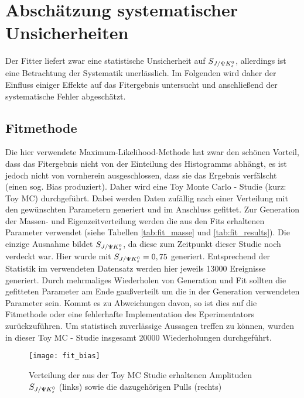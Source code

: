 \chapter{Abschätzung systematischer Unsicherheiten} \label{kap:systematik}
Der Fitter liefert zwar eine statistische Unsicherheit auf $S_{J/\Psi K_s^0}$, allerdings ist eine Betrachtung der Systematik unerlässlich. Im Folgenden wird daher der Einfluss einiger Effekte auf das Fitergebnis untersucht und anschließend der systematische Fehler abgeschätzt.

\section{Fitmethode} \label{kap:fit_bias}
Die hier verwendete Maximum-Likelihood-Methode hat zwar den schönen Vorteil, dass das Fitergebnis nicht von der Einteilung des Histogramms abhängt, es ist jedoch nicht von vornherein ausgeschlossen, dass sie das Ergebnis verfälscht (einen sog. Bias produziert). Daher wird eine Toy Monte Carlo - Studie (kurz: Toy MC) durchgeführt. Dabei werden Daten zufällig nach einer Verteilung mit den gewünschten Parametern generiert und im Anschluss gefittet. Zur Generation der Massen- und Eigenzeitverteilung werden die aus den Fits erhaltenen Parameter verwendet (siehe Tabellen \ref{tab:fit_masse} und \ref{tab:fit_results}). Die einzige Ausnahme bildet $S_{J/\Psi K_s^0}$, da diese zum Zeitpunkt dieser Studie noch verdeckt war. Hier wurde mit $S_{J/\Psi K_s^0} = 0,75$ generiert. Entsprechend der Statistik im verwendeten Datensatz werden hier jeweils 13000 Ereignisse generiert. Durch mehrmaliges Wiederholen von Generation und Fit sollten die gefitteten Parameter am Ende gaußverteilt um die in der Generation verwendeten Parameter sein. Kommt es zu Abweichungen davon, so ist dies auf die Fitmethode oder eine fehlerhafte Implementation des Eperimentators zurückzuführen. Um statistisch zuverlässige Aussagen treffen zu können, wurden in dieser Toy MC - Studie insgesamt 20000 Wiederholungen durchgeführt.

\begin{figure}[hptb]
\centering
\texttt{[image: fit\_bias]}
\caption{Verteilung der aus der Toy MC Studie erhaltenen Amplituden $S_{J/\Psi K_s^0}$ (links) sowie die dazugehörigen Pulls (rechts)}
\label{fig:fit_bias}
\end{figure}

